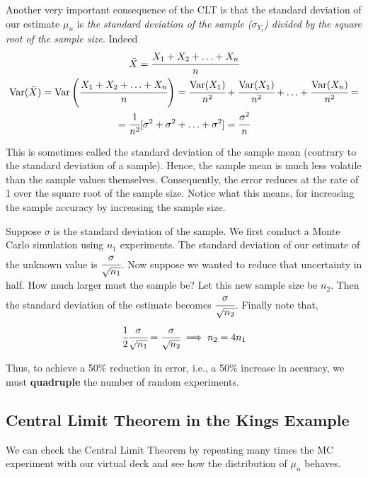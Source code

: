 Another very important consequence of the CLT is that the standard deviation of our estimate $\mu_n$ is \emph{the standard deviation of the sample ($\sigma_{Y_i}$) divided by the square root of the sample size}. Indeed
\begin{equation*}
\begin{gathered}
\bar{X} = \cfrac{X_1 + X_2 +\ldots +X_n}{n}\\
\text{Var}(\bar{X}) = \text{Var}\left(\cfrac{X_1 + X_2 +\ldots +X_n}{n}\right)=\cfrac{\text{Var}(X_1)}{n^2}+\cfrac{\text{Var}(X_1)}{n^2}+\ldots+\cfrac{\text{Var}(X_n)}{n^2} = \\
=\cfrac{1}{n^2}[\sigma^2+\sigma^2+\ldots+\sigma^2] = \cfrac{\sigma^2}{n}
\end{gathered}
\end{equation*}

This is sometimes called the standard deviation of the sample mean (contrary to the standard deviation of a sample). Hence, the sample mean is much less volatile than the sample values themselves. Consequently, the error reduces at the rate of 1 over the square root of the sample size. Notice what this means, for increasing the sample accuracy by increasing the sample size.

Suppose $\sigma$ is the standard deviation of the sample. We first conduct a Monte Carlo simulation using $n_1$ experiments. The standard deviation of our estimate of the unknown value is $\cfrac{\sigma}{\sqrt{n_1}}$. Now suppose we wanted to reduce that uncertainty in half. How much larger must the sample be? Let this new sample size be $n_2$. Then the standard deviation of the estimate becomes $\cfrac{\sigma}{\sqrt{n_2}}$.
Finally note that,
\begin{equation*}
  \cfrac{1}{2}\cfrac{\sigma}{\sqrt{n_1}}  = \cfrac{\sigma}{\sqrt{n_2}} \implies n_2 = 4 n_1
\end{equation*}

Thus, to achieve a 50\% reduction in error, i.e., a 50\% increase in accuracy, we must \textbf{quadruple} the number of random experiments.

\subsection{Central Limit Theorem in the Kings Example}

We can check the Central Limit Theorem by repeating many times the MC experiment with our virtual deck and see how the distribution of $\mu_n$ behaves.

